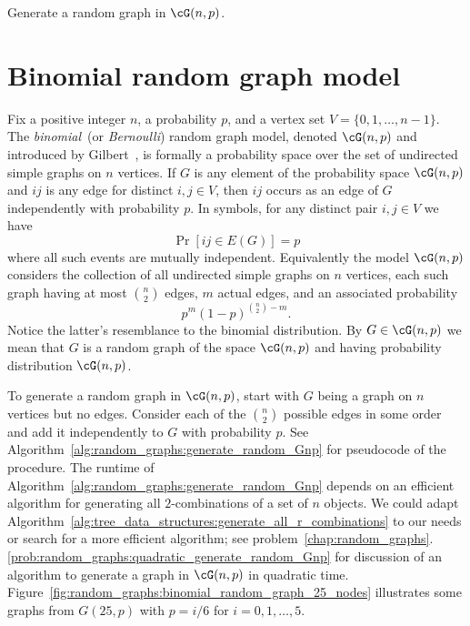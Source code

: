 \begin{algorithm}[!htbp]

\caption{Generate a random graph in $\cG(n,p)$.}
\label{alg:random_graphs:generate_random_Gnp}
\end{algorithm}





\section{Binomial random graph model}

Fix a positive integer $n$, a probability $p$, and a vertex set
$V = \{0, 1, \dots, n - 1\}$. The
\emph{binomial}~(or
\emph{Bernoulli}) random graph model,
denoted $\cG(n,p)$ and introduced by Gilbert~\cite{Gilbert1959}, is
formally a probability space over the set of
undirected simple graphs on $n$ vertices. If $G$ is any element of the
probability space $\cG(n,p)$ and $ij$ is any edge for distinct
$i,j \in V$, then $ij$ occurs as an edge of $G$ independently with
probability $p$. In symbols, for any distinct pair $i,j \in V$ we have
\[
\Pr[ij \in E(G)]
=
p
\]
where all such events are mutually independent. Equivalently the model
$\cG(n,p)$ considers the collection of all undirected simple graphs on
$n$ vertices, each such graph having at most $\binom{n}{2}$ edges, $m$
actual edges, and an associated probability
\begin{equation}
\label{eqn:random_graphs:probability_of_chosen_graph_binomial_model}
p^m (1 - p)^{\binom{n}{2} - m}.
\end{equation}
Notice the latter's resemblance to the
binomial distribution. By
$G \in \cG(n,p)$ we mean that $G$ is a random graph of the space
$\cG(n,p)$ and having probability
distribution $\cG(n,p)$.

To generate a random graph in $\cG(n,p)$, start with $G$ being a graph
on $n$ vertices but no edges. Consider each of the $\binom{n}{2}$
possible edges in some order and add it independently to $G$ with
probability $p$. See
Algorithm~\ref{alg:random_graphs:generate_random_Gnp} for pseudocode
of the procedure. The runtime of
Algorithm~\ref{alg:random_graphs:generate_random_Gnp} depends on an
efficient algorithm for generating all $2$-combinations of a set of
$n$ objects. We could adapt
Algorithm~\ref{alg:tree_data_structures:generate_all_r_combinations}
to our needs or search for a more efficient algorithm; see
problem~\ref{chap:random_graphs}.\ref{prob:random_graphs:quadratic_generate_random_Gnp}
for discussion of an algorithm to generate a graph in $\cG(n,p)$ in
quadratic
time. Figure~\ref{fig:random_graphs:binomial_random_graph_25_nodes}
illustrates some graphs from $G(25,p)$ with $p = i/6$ for
$i = 0, 1, \dots, 5$.

